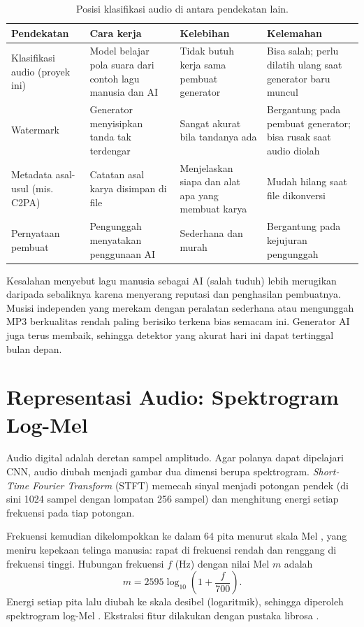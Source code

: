 \begin{table}[htbp]
\centering
\singlespacing\small
\caption{Posisi klasifikasi audio di antara pendekatan lain.}
\label{tab:pendekatan}
\begin{tabularx}{\textwidth}{L{2.7cm} Y Y Y}
\toprule
Pendekatan & Cara kerja & Kelebihan & Kelemahan\\
\midrule
Klasifikasi audio (proyek ini) & Model belajar pola suara dari contoh lagu manusia dan AI & Tidak butuh kerja sama pembuat generator & Bisa salah; perlu dilatih ulang saat generator baru muncul\\
Watermark & Generator menyisipkan tanda tak terdengar & Sangat akurat bila tandanya ada & Bergantung pada pembuat generator; bisa rusak saat audio diolah\\
Metadata asal-usul (mis. C2PA) & Catatan asal karya disimpan di file & Menjelaskan siapa dan alat apa yang membuat karya & Mudah hilang saat file dikonversi\\
Pernyataan pembuat & Pengunggah menyatakan penggunaan AI & Sederhana dan murah & Bergantung pada kejujuran pengunggah\\
\bottomrule
\end{tabularx}
\end{table}

Kesalahan menyebut lagu manusia sebagai AI (salah tuduh) lebih merugikan daripada sebaliknya karena menyerang reputasi dan penghasilan pembuatnya. Musisi independen yang merekam dengan peralatan sederhana atau mengunggah MP3 berkualitas rendah paling berisiko terkena bias semacam ini. Generator AI juga terus membaik, sehingga detektor yang akurat hari ini dapat tertinggal bulan depan.

\section{Representasi Audio: Spektrogram Log-Mel}
Audio digital adalah deretan sampel amplitudo. Agar polanya dapat dipelajari CNN, audio diubah menjadi gambar dua dimensi berupa spektrogram. \textit{Short-Time Fourier Transform} (STFT) memecah sinyal menjadi potongan pendek (di sini 1024 sampel dengan lompatan 256 sampel) dan menghitung energi setiap frekuensi pada tiap potongan.

Frekuensi kemudian dikelompokkan ke dalam 64 pita menurut skala Mel \cite{stevens1937scale}, yang meniru kepekaan telinga manusia: rapat di frekuensi rendah dan renggang di frekuensi tinggi. Hubungan frekuensi $f$ (Hz) dengan nilai Mel $m$ adalah
\begin{equation}
m = 2595 \log_{10}\!\left(1 + \frac{f}{700}\right).
\label{eq:mel}
\end{equation}
Energi setiap pita lalu diubah ke skala desibel (logaritmik), sehingga diperoleh spektrogram log-Mel \cite{hershey2017cnn}. Ekstraksi fitur dilakukan dengan pustaka librosa \cite{mcfee2015librosa}.

